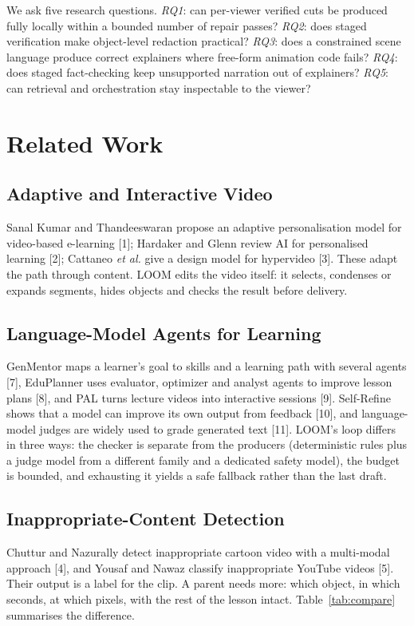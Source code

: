 \documentclass[9pt,a4paper]{extarticle}
\newcommand{\tab}[1]{Table~\ref{#1}}
\begin{document}
We ask five research questions. \emph{RQ1}: can per-viewer verified cuts be produced fully locally within a bounded
number of repair passes? \emph{RQ2}: does staged verification make object-level redaction practical? \emph{RQ3}: does a
constrained scene language produce correct explainers where free-form animation code fails? \emph{RQ4}: does staged
fact-checking keep unsupported narration out of explainers? \emph{RQ5}: can retrieval and orchestration stay
inspectable to the viewer?

\section{Related Work}
\subsection{Adaptive and Interactive Video}
Sanal Kumar and Thandeeswaran propose an adaptive personalisation model for video-based e-learning [1]; Hardaker and
Glenn review AI for personalised learning [2]; Cattaneo \emph{et al.} give a design model for hypervideo [3]. These
adapt the path through content. LOOM edits the video itself: it selects, condenses or expands segments, hides objects
and checks the result before delivery.

\subsection{Language-Model Agents for Learning}
GenMentor maps a learner's goal to skills and a learning path with several agents [7], EduPlanner uses evaluator,
optimizer and analyst agents to improve lesson plans [8], and PAL turns lecture videos into interactive sessions [9].
Self-Refine shows that a model can improve its own output from feedback [10], and language-model judges are widely
used to grade generated text [11]. LOOM's loop differs in three ways: the checker is separate from the producers
(deterministic rules plus a judge model from a different family and a dedicated safety model), the budget is bounded,
and exhausting it yields a safe fallback rather than the last draft.

\subsection{Inappropriate-Content Detection}
Chuttur and Nazurally detect inappropriate cartoon video with a multi-modal approach [4], and Yousaf and Nawaz classify
inappropriate YouTube videos [5]. Their output is a label for the clip. A parent needs more: which object, in which
seconds, at which pixels, with the rest of the lesson intact. \tab{tab:compare} summarises the difference.
\end{document}
